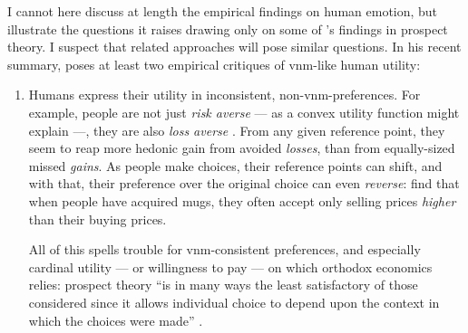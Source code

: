 I cannot here discuss at length the empirical findings on human emotion, but illustrate the questions it raises drawing only on some of \citeauthor{Kahneman2011}'s findings in prospect theory.
I suspect that related approaches will pose similar questions.
In his recent summary, \cite{Kahneman2011} poses at least two empirical critiques of \gls{vnm}-like human utility:

\begin{enumerate}
	\item \label{itm:inconsistence}
	Humans express their utility in inconsistent, non-\gls{vnm}-preferences.
	For example, people are not just \emph{risk averse} --- as a convex utility function might explain ---, they are also \emph{loss averse} \citep{KahnemanTversky1979}.
	From any given reference point, they seem to reap more hedonic gain from avoided \emph{losses}, than from equally-sized missed \emph{gains}.
	As people make choices, their reference points can shift, and with that, their preference over the original choice can even \emph{reverse}:
	\cite{KahnemanTversky1979} find that when people have acquired mugs, they often accept only selling prices \emph{higher} than their buying prices.

	All of this spells trouble for \gls{vnm}-consistent preferences, and especially cardinal utility --- or willingness to pay --- on which orthodox economics relies:
	prospect theory ``is in many ways the least satisfactory of those considered since it allows individual choice to depend upon the context in which the choices were made'' \citep[634]{Grether1979}.


\end{enumerate}
